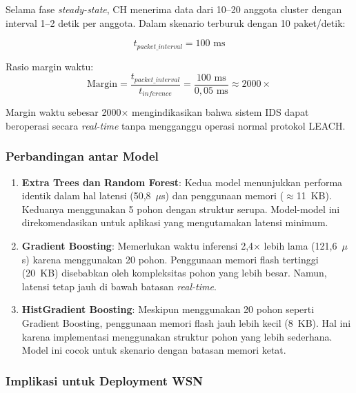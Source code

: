 Selama fase \textit{steady-state}, CH menerima data dari 10--20 anggota cluster dengan interval 1--2 detik per anggota. Dalam skenario terburuk dengan 10 paket/detik:

\begin{equation}
    t_{packet\_interval} = 100 \text{ ms}
\end{equation}

Rasio margin waktu:
\begin{equation}
    \text{Margin} = \frac{t_{packet\_interval}}{t_{inference}} = \frac{100 \text{ ms}}{0,05 \text{ ms}} \approx 2000\times
\end{equation}

Margin waktu sebesar 2000$\times$ mengindikasikan bahwa sistem IDS dapat beroperasi secara \textit{real-time} tanpa mengganggu operasi normal protokol LEACH.

\subsubsection{Perbandingan antar Model}

\begin{enumerate}
    \item \textbf{Extra Trees dan Random Forest}: Kedua model menunjukkan performa identik dalam hal latensi (50,8~$\mu$s) dan penggunaan memori ($\approx$11~KB). Keduanya menggunakan 5 pohon dengan struktur serupa. Model-model ini direkomendasikan untuk aplikasi yang mengutamakan latensi minimum.
    
    \item \textbf{Gradient Boosting}: Memerlukan waktu inferensi 2,4$\times$ lebih lama (121,6~$\mu$s) karena menggunakan 20 pohon. Penggunaan memori flash tertinggi (20~KB) disebabkan oleh kompleksitas pohon yang lebih besar. Namun, latensi tetap jauh di bawah batasan \textit{real-time}.
    
    \item \textbf{HistGradient Boosting}: Meskipun menggunakan 20 pohon seperti Gradient Boosting, penggunaan memori flash jauh lebih kecil (8~KB). Hal ini karena implementasi menggunakan struktur pohon yang lebih sederhana. Model ini cocok untuk skenario dengan batasan memori ketat.
\end{enumerate}

\subsubsection{Implikasi untuk Deployment WSN}

